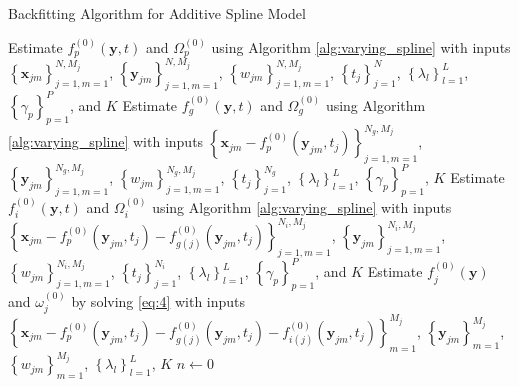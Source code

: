 \documentclass[11pt,reqno]{article}
\theoremstyle{definition}
\begin{document}
\begin{algorithm}
\caption{Backfitting Algorithm for Additive Spline Model}\label{alg:backfitting}

  Estimate $f_{p}^{(0)}(\mathbf{y}, t)$ and $\Omega_{p}^{(0)}$ using Algorithm \ref{alg:varying_spline} with inputs $\left\{\mathbf{x}_{jm}\right\}_{j=1, m=1}^{N, M_j}$, $\left\{\mathbf{y}_{jm}\right\}_{j=1, m=1}^{N, M_j}$, $\left\{w_{jm}\right\}_{j=1, m=1}^{N, M_j}$, $\left\{t_{j}\right\}_{j=1}^{N}$, $\left\{\lambda_l\right\}_{l=1}^{L}$, $\left\{\gamma_p\right\}_{p=1}^{P}$, and $K$\;
   {
    Estimate $f_{g}^{(0)}(\mathbf{y}, t)$ and $\Omega_{g}^{(0)}$ using Algorithm \ref{alg:varying_spline} with inputs $\left\{\mathbf{x}_{jm} - f_{p}^{(0)}(\mathbf{y}_{jm}, t_j)\right\}_{j=1, m=1}^{N_g, M_j}$, $\left\{\mathbf{y}_{jm}\right\}_{j=1, m=1}^{N_g, M_j}$, $\left\{w_{jm}\right\}_{j=1, m=1}^{N_g, M_j}$, $\left\{t_j\right\}_{j=1}^{N_g}$, $\left\{\lambda_l\right\}_{l=1}^{L}$, $\left\{\gamma_p\right\}_{p=1}^{P}$, $K$\;
  }
   {
    Estimate $f_{i}^{(0)}(\mathbf{y}, t)$ and $\Omega_{i}^{(0)}$ using Algorithm \ref{alg:varying_spline} with inputs $\left\{\mathbf{x}_{jm} - f_{p}^{(0)}(\mathbf{y}_{jm}, t_j) - f_{g(j)}^{(0)}(\mathbf{y}_{jm}, t_j)\right\}_{j=1, m=1}^{N_i, M_j}$, $\left\{\mathbf{y}_{jm}\right\}_{j=1, m=1}^{N_i, M_j}$, $\left\{w_{jm}\right\}_{j=1, m=1}^{N_i, M_j}$, $\left\{t_j\right\}_{j=1}^{N_i}$, $\left\{\lambda_l\right\}_{l=1}^{L}$, $\left\{\gamma_p\right\}_{p=1}^{P}$, and $K$\;
  }
   {
    Estimate $f_{j}^{(0)}(\mathbf{y})$ and $\omega_{j}^{(0)}$ by solving \ref{eq:4} with inputs $\left\{\mathbf{x}_{jm} - f_{p}^{(0)}(\mathbf{y}_{jm}, t_j) - f_{g(j)}^{(0)}(\mathbf{y}_{jm}, t_j) - f_{i(j)}^{(0)}(\mathbf{y}_{jm}, t_j)\right\}_{m=1}^{M_j}$, $\left\{\mathbf{y}_{jm}\right\}_{m=1}^{M_j}$, $\left\{w_{jm}\right\}_{m = 1}^{M_j}$, $\left\{\lambda_l\right\}_{l=1}^{L}$, $K$\;
  }
  $n \gets 0$\;
   {
}
\end{algorithm}
\end{document}

